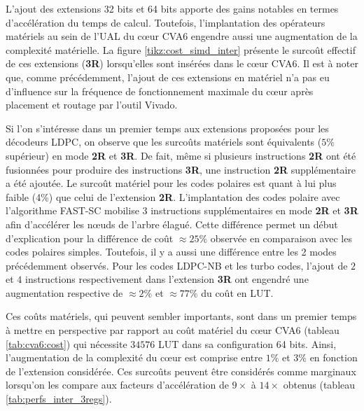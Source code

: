 \documentclass[../main.tex]{subfiles}
\begin{document}
L'ajout des extensions 32 bits et 64 bits apporte des gains notables en termes d'accélération du temps de calcul.
Toutefois, l'implantation des opérateurs matériels au sein de l'UAL du cœur CVA6 engendre aussi une augmentation de la complexité matérielle.
La figure \ref{tikz:cost_simd_inter} présente le surcoût effectif de ces extensions (\textbf{3R}) lorsqu'elles sont insérées dans le cœur CVA6. Il est à noter que, comme précédemment, l'ajout de ces extensions en matériel n'a pas eu d'influence sur la fréquence de fonctionnement maximale du cœur après placement et routage par l'outil Vivado.

Si l'on s'intéresse dans un premier temps aux extensions proposées pour les décodeurs LDPC, on observe que les surcoûts matériels sont équivalents ($5\%$ supérieur) en mode \textbf{2R} et \textbf{3R}. 
De fait, même si plusieurs instructions \textbf{2R} ont été fusionnées pour produire des instructions \textbf{3R}, une instruction \textbf{2R} supplémentaire a été ajoutée. 
Le surcoût matériel pour les codes polaires est quant à lui plus faible (4\%) que celui de l'extension \textbf{2R}.
L'implantation des codes polaire avec l'algorithme FAST-SC mobilise 3 instructions supplémentaires en mode \textbf{2R} et \textbf{3R} afin d'accélérer les nœuds de l'arbre élagué. Cette différence permet un début d'explication pour la différence de coût $\approx 25\%$ observée en comparaison avec les codes polaires simples. Toutefois, il y a aussi une différence entre les 2 modes précédemment observés.
Pour les codes LDPC-NB et les turbo codes, l'ajout de $2$ et $4$ instructions respectivement dans l'extension \textbf{3R} ont engendré une augmentation respective de $\approx 2\%$ et $\approx 77\%$ du coût en LUT.

Ces coûts matériels, qui peuvent sembler importants, sont dans un premier temps à mettre en perspective par rapport au coût matériel du cœur CVA6 (tableau \ref{tab:cva6:cost}) qui nécessite $34576$ LUT dans sa configuration 64 bits.
Ainsi, l'augmentation de la complexité du cœur est comprise entre $1\%$ et $3\%$ en fonction de l'extension considérée.
Ces surcoûts peuvent être considérés comme marginaux lorsqu'on les compare aux facteurs d'accélération de $9\times$ à $14\times$ obtenus (tableau \ref{tab:perfs_inter_3regs}).
\end{document}
